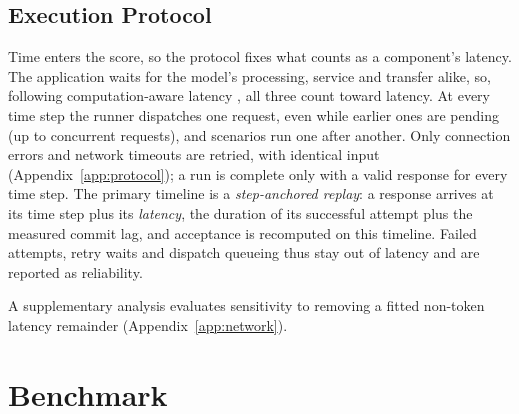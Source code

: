 \documentclass[11pt]{article}
\begin{document}
\subsection{Execution Protocol}
\label{sec:execution}
Time enters the score, so the protocol fixes what counts as a component's latency.
The application waits for the model's processing, service and transfer alike, so, following computation-aware latency \citep{ma2020simulmt}, all three count toward latency.
At every time step the runner dispatches one request, even while earlier ones are pending (up to \MaxWorkers{} concurrent requests), and scenarios run one after another.
Only connection errors and network timeouts are retried, with identical input (Appendix~\ref{app:protocol}); a run is complete only with a valid response for every time step.
The primary timeline is a \emph{step-anchored replay}: a response arrives at its time step plus its \emph{latency}, the duration of its successful attempt plus the measured commit lag, and acceptance is recomputed on this timeline.
Failed attempts, retry waits and dispatch queueing thus stay out of latency and are reported as reliability.

A supplementary analysis evaluates sensitivity to removing a fitted non-token latency remainder (Appendix~\ref{app:network}).

\section{Benchmark}
\label{sec:lite}
\end{document}
